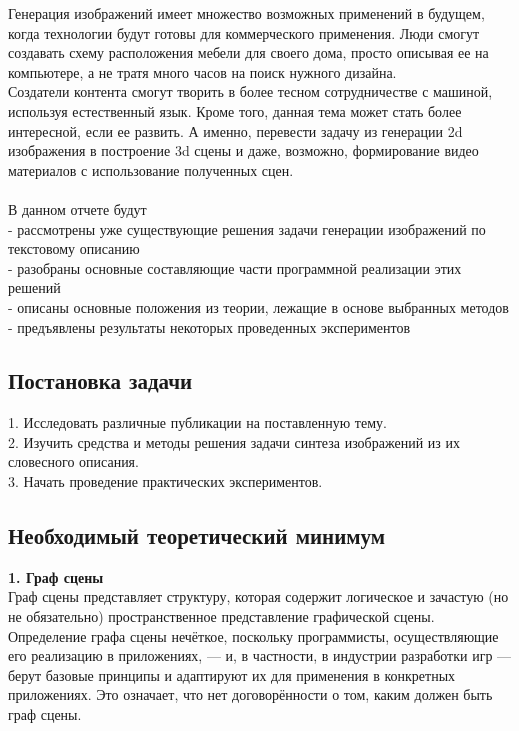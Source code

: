 \documentclass{article}
\begin{document}
    Генерация изображений имеет множество возможных применений в
    будущем, когда технологии будут готовы для коммерческого применения. 
    Люди смогут создавать схему расположения мебели для своего дома, просто описывая ее на компьютере, а не тратя много часов на поиск нужного дизайна.\\ 
    Создатели контента смогут творить в более тесном сотрудничестве с машиной, используя естественный язык.
    Кроме того, данная тема может стать более интересной, если ее развить. А именно, перевести задачу из генерации 2d изображения в построение 3d сцены и даже, возможно, формирование видео материалов с использование полученных сцен.\\ \\
    В данном отчете будут \\
    - рассмотрены уже существующие решения задачи генерации изображений по текстовому описанию\\
    - разобраны основные составляющие части программной реализации этих решений\\
    - описаны основные положения из теории, лежащие в основе выбранных методов\\
    - предъявлены результаты некоторых проведенных экспериментов\\
    \newpage
    \begin{center} 
    \section{Постановка задачи}
    \end{center} 
      \large 1. Исследовать различные публикации на поставленную тему.\\
             2. Изучить средства и методы решения задачи синтеза изображений из их словесного описания.\\
             3. Начать проведение практических экспериментов.\\
    \newpage
    \begin{center} 
    \section{Необходимый теоретический минимум}
    \end{center} 
      \large \textbf{1. Граф сцены}\\
      Граф сцены представляет структуру, которая содержит логическое и зачастую (но не обязательно) пространственное представление графической сцены. Определение графа сцены нечёткое, поскольку программисты, осуществляющие его реализацию в приложениях, — и, в частности, в индустрии разработки игр — берут базовые принципы и адаптируют их для применения в конкретных приложениях. Это означает, что нет договорённости о том, каким должен быть граф сцены.
\end{document}
